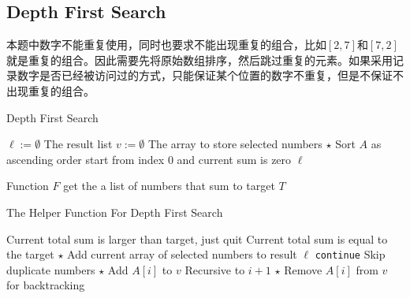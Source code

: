 \subsection{Depth First Search}
本题中数字不能重复使用，同时也要求不能出现重复的组合，比如$[2,7]$和$[7,2]$就是重复的组合。因此需要先将原始数组排序，然后跳过重复的元素。如果采用记录数字是否已经被访问过的方式，只能保证某个位置的数字不重复，但是不保证不出现重复的组合。

\setcounter{algorithm}{0}
\begin{algorithm}[H]
\caption{Depth First Search}
\begin{algorithmic}[1]
\State $\ell := \emptyset$ \Comment The result list
\State $v := \emptyset$ \Comment The array to store selected numbers
\State $\star$ Sort $A$ as ascending order
\State {} \Comment start from index 0 and current sum is zero
\State \Return $\ell$
\EndProcedure
\end{algorithmic}
\end{algorithm}

Function $F$ get the a list of numbers that sum to target $T$
\begin{algorithm}[H]
\caption{The Helper Function For Depth First Search}
\begin{algorithmic}[1]
 \Comment Current total sum is larger than target, just quit
\State \Return 
\EndIf
{} \Comment Current total sum is equal to the target
\State $\star$ Add current array of selected numbers to result $\ell$
\EndIf
{}
\State \texttt{continue} \Comment Skip duplicate numbers
\EndIf
\State $\star$ Add $A[i]$ to $v$ 
\State {} \Comment Recursive to $i+1$
\State $\star$ Remove $A[i]$ from $v$ for backtracking
\EndFor
\EndFunction
\end{algorithmic}
\end{algorithm}

